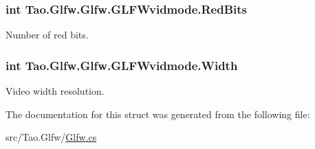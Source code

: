 \hypertarget{struct_tao_1_1_glfw_1_1_glfw_1_1_g_l_f_wvidmode_a384d6f163e550ef68a91b33eaa09507a}{
\subsubsection[{RedBits}]{\setlength{\rightskip}{0pt plus 5cm}int {\bf Tao.Glfw.Glfw.GLFWvidmode.RedBits}}}
\label{struct_tao_1_1_glfw_1_1_glfw_1_1_g_l_f_wvidmode_a384d6f163e550ef68a91b33eaa09507a}


Number of red bits. 

\hypertarget{struct_tao_1_1_glfw_1_1_glfw_1_1_g_l_f_wvidmode_a7fdfa1ceaf3bfbf0e696989713b49586}{
\subsubsection[{Width}]{\setlength{\rightskip}{0pt plus 5cm}int {\bf Tao.Glfw.Glfw.GLFWvidmode.Width}}}
\label{struct_tao_1_1_glfw_1_1_glfw_1_1_g_l_f_wvidmode_a7fdfa1ceaf3bfbf0e696989713b49586}


Video width resolution. 



The documentation for this struct was generated from the following file:\begin{DoxyCompactItemize}
\item 
src/Tao.Glfw/\hyperlink{_glfw_8cs}{Glfw.cs}\end{DoxyCompactItemize}
